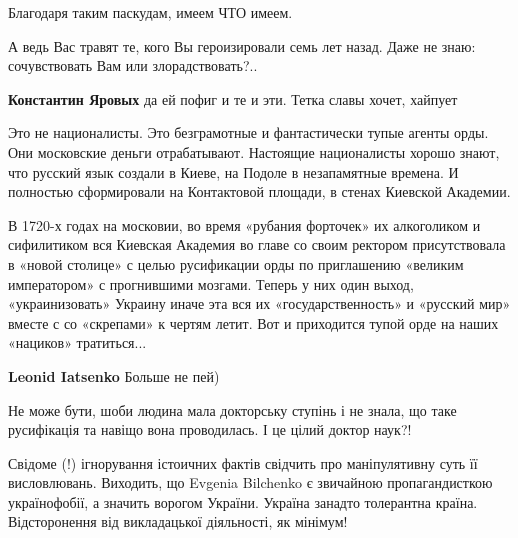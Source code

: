 \begin{itemize}
Благодаря таким паскудам, имеем ЧТО имеем.



А ведь Вас травят те, кого Вы героизировали семь лет назад. Даже не знаю:
сочувствовать Вам или злорадствовать?..

\begin{itemize}

\textbf{Константин Яровых} да ей пофиг и те и эти. Тетка славы хочет, хайпует
\end{itemize}



Это не националисты. Это безграмотные и фантастически тупые агенты орды. Они
московские деньги отрабатывают. Настоящие националисты хорошо знают, что
русский язык создали в Киеве, на Подоле в незапамятные времена. И полностью
сформировали на Контактовой площади, в стенах Киевской Академии. 

В 1720-х годах на московии, во время «рубания форточек» их алкоголиком и
сифилитиком вся Киевская Академия во главе со своим ректором присутствовала в
«новой столице» с целью русификации орды по приглашению «великим императором» с
прогнившими мозгами. Теперь у них один выход, «украинизовать» Украину иначе эта
вся их «государственность» и «русский мир» вместе с со «скрепами» к чертям
летит. Вот и приходится тупой орде на наших «нациков» тратиться...

\begin{itemize}

\textbf{Leonid Iatsenko} Больше не пей)
\end{itemize}



Не може бути, шоби людина мала докторську ступінь і не знала, що таке
русифікація та навіщо вона проводилась. І це цілий доктор наук?! 

Свідоме (!) ігнорування істоичних фактів свідчить про маніпулятивну суть її
висловлювань. Виходить, що Evgenia Bilchenko є звичайною пропагандисткою
українофобії, а значить ворогом України. Україна занадто толерантна країна.
Відсторонення від викладацької діяльності, як мінімум!


\end{itemize}
